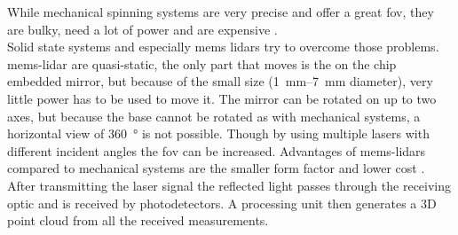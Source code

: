 While mechanical spinning systems are very precise and offer a great \gls{fov}, they are bulky, need a lot of power and are expensive \cite{Fujii2005}.\\
Solid state systems and especially \gls{mems} \glspl{lidar} try to overcome those problems.
\gls{mems}-\gls{lidar} are quasi-static, the only part that moves is the on the chip embedded mirror, but because of the small size (\SIrange{1}{7}{\milli\metre} diameter), very little power has to be used to move it.
The mirror can be rotated on up to two axes, but because the base cannot be rotated as with mechanical systems, a horizontal view of \SI{360}{\degree} is not possible.
Though by using multiple lasers with different incident angles the \gls{fov} can be increased.
Advantages of \gls{mems}-\glspl{lidar} compared to mechanical systems are the smaller form factor and lower cost \cite{Wang2020}.\\
After transmitting the laser signal the reflected light passes through the receiving optic and is received by photodetectors.
A processing unit then generates a 3D point cloud from all the received measurements.


